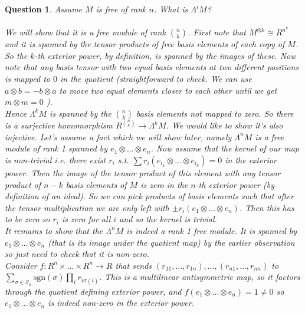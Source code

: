 \documentclass[a4paper]{article}
\newtheorem{que}[thm]{Question}
\begin{document}
\begin{que} Assume $M$ is free of rank $n$. What is $\Lambda^i M$?\\\\
    We will show that it is a free module of rank $\binom{n}{k}$. First note that $M^{\otimes k}\cong R^{n^{k}}$ and it is spanned by the tensor products of free basis elements of each copy of $M$. So the $k$-th exterior power, by definition, is spanned by the images of these. Now note that any basis tensor with two equal basis elements at two different positions is mapped to $0$ in the quotient (straightforward to check. We can use $a\otimes b=-b\otimes a$ to move two equal elements closer to each other until we get $m\otimes m=0$ ).\\
    Hence $\Lambda^{k}M$ is spanned by the $\binom{n}{k}$ basis elements not mapped to zero. So there is a surjective homomorphism $R^{\binom{n}{k}}\to \Lambda^{k}M$. We would like to show it's also injective. Let's assume a fact which we will show later, namely $\Lambda^{n}M$ is a free module of rank 1 spanned by $e_1\otimes \ldots\otimes e_n$. Now assume that the kernel of our map is non-trivial i.e. there exist $r_i$ s.t. $\sum r_i (e_{i_1}\otimes \ldots\otimes e_{i_k})=0$ in the exterior power. Then the image of the tensor product of this element with any tensor product of $n-k$ basis elements of $M$ is zero in the  $n$-th exterior power (by definition of an ideal). So we can pick products of basis elements such that after the tensor multiplication we are only left with  $\pm r_i \left( e_1 \otimes \ldots \otimes e_n \right) $. Then this has to be zero so $r_i$ is zero for all $i$ and so the kernel is trivial.\\
    It remains to show that the $\Lambda^{n}M$ is indeed a rank 1 free module. It is spanned by $e_1\otimes \ldots\otimes e_n$ (that is its image under the quotient map) by the earlier observation so just need to check that it is non-zero. \\Consider $f:R^{n}\times \ldots\times R^{n}\to R$ that sends $\left( r_{11},\ldots,r_{1n} \right),\ldots,\left(r_{n1},\ldots,r_{nn}\right) $ to $\sum_{\sigma\in S_n}\text{sgn}\left( \sigma \right) \prod_{i} r_{i\sigma\left( i \right) }$. This is a multilinear antisymmetric map, so it factors through the quotient defining exterior power, and $f(e_1 \otimes \ldots \otimes e_n ) = 1\neq 0$ so $e_1\otimes \ldots\otimes e_n$ is indeed non-zero in the exterior power.
\end{que}
\end{document}
